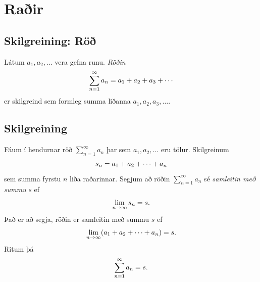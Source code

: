 \documentclass[a4paper,10pt,icelandic]{sphinxmanual}
\begin{document}

\section{Raðir}
\label{kafli09:rair}\label{kafli09:index-5}

\subsection{Skilgreining: Röð}
\label{kafli09:skilgreining-ro}
Látum \(a_1, a_2, \ldots\) vera gefna runu. \textit{Röðin}
\begin{gather}
\begin{split}\sum_{n=1}^\infty a_n  = a_1+a_2+a_3+\cdots\end{split}\notag
\end{gather}
er skilgreind sem formleg summa liðanna \(a_1, a_2, a_3, \ldots\).


\subsection{Skilgreining}
\label{kafli09:id6}\label{kafli09:index-6}
Fáum í hendurnar röð \(\sum_{n=1}^\infty a_n\) þar sem
\(a_1, a_2, \ldots\) eru tölur. Skilgreinum
\begin{gather}
\begin{split}s_n=a_1+a_2+\cdots+a_n\end{split}\notag
\end{gather}
sem summa fyrstu \(n\) liða raðarinnar. Segjum að röðin
\(\sum_{n=1}^\infty a_n\) sé \textit{samleitin með summu} \(s\) ef
\begin{gather}
\begin{split}\lim_{n\rightarrow\infty}s_n=s.\end{split}\notag
\end{gather}
Það er að segja, röðin er samleitin með summu \(s\) ef
\begin{gather}
\begin{split}\lim_{n\rightarrow \infty}(a_1+a_2+\cdots+a_n)=s.\end{split}\notag
\end{gather}
Ritum þá
\begin{gather}
\begin{split}\sum_{n=1}^\infty a_n=s.\end{split}\notag
\end{gather}
\end{document}

